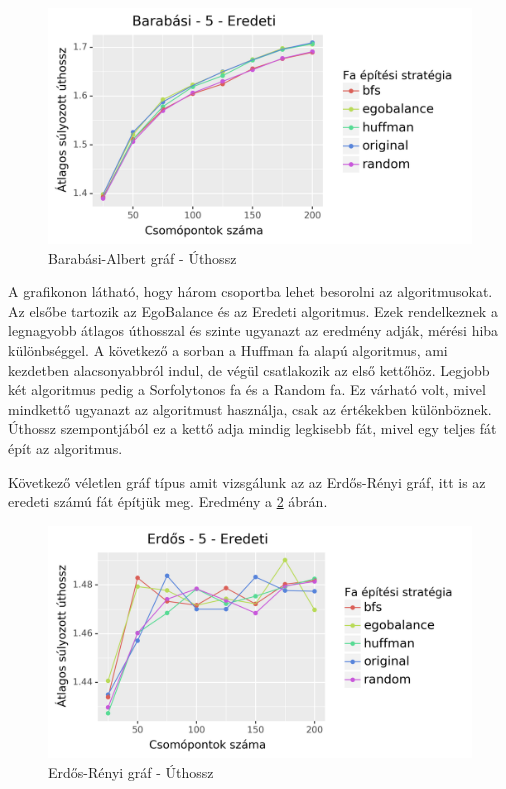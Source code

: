\documentclass[12pt]{report}
\begin{document}
\begin{figure}[H]
	\begin{center}
		\includegraphics[width=0.9\linewidth]{pictures/barabasi_len_e.png}
		\caption{Barabási-Albert gráf - Úthossz}
		\label{barabasi-len}
	\end{center}
\end{figure}

A grafikonon látható, hogy három csoportba lehet besorolni az algoritmusokat. 
Az elsőbe tartozik az EgoBalance és az Eredeti algoritmus.
Ezek rendelkeznek a legnagyobb átlagos úthosszal és szinte ugyanazt az eredmény adják, mérési hiba különbséggel.
A következő a sorban a Huffman fa alapú algoritmus, ami kezdetben alacsonyabbról indul, de végül csatlakozik az első kettőhöz.
Legjobb két algoritmus pedig a Sorfolytonos fa és a Random fa.
Ez várható volt, mivel mindkettő ugyanazt az algoritmust használja, csak az értékekben különböznek.
Úthossz szempontjából ez a kettő adja mindig legkisebb fát, mivel egy teljes fát épít az algoritmus.


Következő véletlen gráf típus amit vizsgálunk az az Erdős-Rényi gráf, itt is az eredeti számú fát építjük meg.
Eredmény a \ref{erdos-len} ábrán.

\begin{figure}[H]
	\begin{center}
		\includegraphics[width=0.9\linewidth]{pictures/erdos_len_e.png}
		\caption{Erdős-Rényi gráf - Úthossz}
		\label{erdos-len}
	\end{center}
\end{figure}
\end{document}
